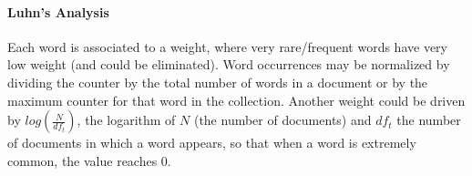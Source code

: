 \paragraph{Luhn's Analysis}

Each word is associated to a weight, where very rare/frequent words have very low weight (and could be eliminated).
Word occurrences may be normalized by dividing the counter by the total number of words in a document or by the maximum counter for that word in the collection.
Another weight could be driven by $log(\frac N {df_t})$, the logarithm of $N$ (the number of documents) and $df_t$ the number of documents in which a word appears, so that when a word is extremely common, the value reaches $0$.
